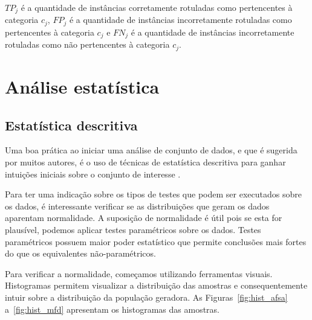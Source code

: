 \documentclass[conference]{IEEEtran}
\begin{document}
$TP_j$ é a quantidade de instâncias corretamente rotuladas como pertencentes à categoria $c_j$, $FP_j$ é a quantidade de instâncias incorretamente rotuladas como pertencentes à categoria $c_j$ e $FN_j$ é a quantidade de instâncias incorretamente rotuladas como não pertencentes à categoria $c_j$. 

\section{Análise estatística}
\label{sec:analise}

\subsection{Estatística descritiva}

Uma boa prática ao iniciar uma análise de conjunto de dados, e que é sugerida por muitos autores, é o uso de técnicas de estatística descritiva para ganhar intuições iniciais sobre o conjunto de interesse \cite{montgomery2010applied}.

Para ter uma indicação sobre os tipos de testes que podem ser executados sobre os dados, é interessante verificar se as distribuições que geram os dados aparentam normalidade.
A suposição de normalidade é útil pois se esta for plausível, podemos aplicar testes paramétricos sobre os dados.
Testes paramétricos possuem maior poder estatístico que permite conclusões mais fortes do que os equivalentes não-paramétricos.

Para verificar a normalidade, começamos utilizando ferramentas visuais.
Histogramas permitem visualizar a distribuição das amostras e consequentemente intuir sobre a distribuição da população geradora.
As Figuras~\ref{fig:hist_afsa} a~\ref{fig:hist_mfd} apresentam os histogramas das amostras.
\end{document}
